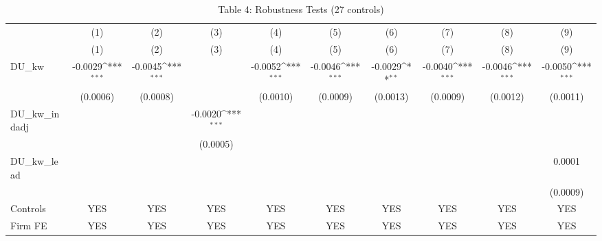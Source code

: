\begin{table}[htbp]\centering
\def\sym#1{\ifmmode^{#1}\else\(^{#1}\)\fi}
\caption{Table 4: Robustness Tests (27 controls)}
\begin{tabular}{l*{9}{c}}
\toprule
          &\multicolumn{1}{c}{(1)}&\multicolumn{1}{c}{(2)}&\multicolumn{1}{c}{(3)}&\multicolumn{1}{c}{(4)}&\multicolumn{1}{c}{(5)}&\multicolumn{1}{c}{(6)}&\multicolumn{1}{c}{(7)}&\multicolumn{1}{c}{(8)}&\multicolumn{1}{c}{(9)}\\
          &\multicolumn{1}{c}{(1)}&\multicolumn{1}{c}{(2)}&\multicolumn{1}{c}{(3)}&\multicolumn{1}{c}{(4)}&\multicolumn{1}{c}{(5)}&\multicolumn{1}{c}{(6)}&\multicolumn{1}{c}{(7)}&\multicolumn{1}{c}{(8)}&\multicolumn{1}{c}{(9)}\\
\midrule
DU\_kw     &  -0.0029\sym{***}&  -0.0045\sym{***}&                  &  -0.0052\sym{***}&  -0.0046\sym{***}&  -0.0029\sym{**} &  -0.0040\sym{***}&  -0.0046\sym{***}&  -0.0050\sym{***}\\
          & (0.0006)         & (0.0008)         &                  & (0.0010)         & (0.0009)         & (0.0013)         & (0.0009)         & (0.0012)         & (0.0011)         \\
\addlinespace
DU\_kw\_indadj&                  &                  &  -0.0020\sym{***}&                  &                  &                  &                  &                  &                  \\
          &                  &                  & (0.0005)         &                  &                  &                  &                  &                  &                  \\
\addlinespace
DU\_kw\_lead&                  &                  &                  &                  &                  &                  &                  &                  &   0.0001         \\
          &                  &                  &                  &                  &                  &                  &                  &                  & (0.0009)         \\
\midrule
Controls  &      YES         &      YES         &      YES         &      YES         &      YES         &      YES         &      YES         &      YES         &      YES         \\
Firm FE   &      YES         &      YES         &      YES         &      YES         &      YES         &      YES         &      YES         &      YES         &      YES         \\

\end{tabular}
\end{table}
